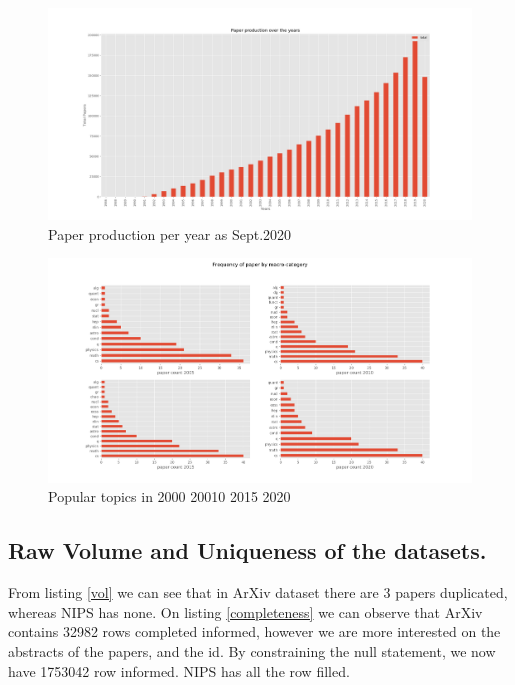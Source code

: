 \begin{figure}
\centering
\includegraphics[width=1\linewidth]{images/paper_prod}
\caption{Paper production per year as Sept.2020}
\label{fig:paper_prod}
\end{figure}


\begin{figure}
\centering
\includegraphics[width=1\linewidth]{images/paper_topics}
\caption{Popular topics in 2000 20010 2015 2020}
\label{fig:paper_topics}
\end{figure}

\subsection{Raw Volume and Uniqueness of the datasets.}

From listing \ref{vol} we can see that in ArXiv dataset there are 3 papers duplicated, whereas NIPS has none. On listing \ref{completeness}
we can observe that ArXiv contains 32982 rows completed informed, however we are more interested on the abstracts of the papers, and the id. 
By constraining the null statement, we now have 1753042 row informed. NIPS has all the row filled. 


